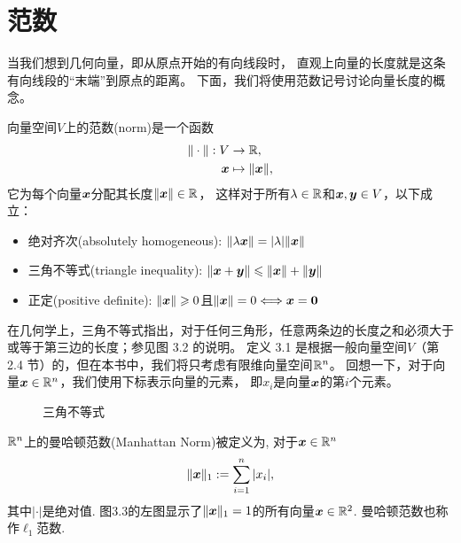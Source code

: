 \section{范数}
当我们想到几何向量，即从原点开始的有向线段时，
直观上向量的长度就是这条有向线段的“末端”到原点的距离。
下面，我们将使用范数记号讨论向量长度的概念。

\begin{definition}[范数]
    向量空间$V$上的范数(norm)是一个函数
    \begin{align}
        \| \cdot \| : V &\rightarrow \mathbb{R},\\
        \boldsymbol{x} &\mapsto \|\boldsymbol{x}\|,
    \end{align}
    它为每个向量$\boldsymbol{x}$分配其长度$\|\boldsymbol{x}\| \in \mathbb{R}$，
    这样对于所有$\lambda \in \mathbb{R}$和$\boldsymbol{x}, \boldsymbol{y} \in V$，以下成立：
    \begin{itemize}
        \item 绝对齐次(absolutely homogeneous): $\|\lambda\boldsymbol{x}\| = |\lambda|\|\boldsymbol{x}\|$
        \item 三角不等式(triangle inequality): $\|\boldsymbol{x}+\boldsymbol{y}\| \leqslant \|\boldsymbol{x}\| + \|\boldsymbol{y}\|$
        \item 正定(positive definite): $\|\boldsymbol{x}\| \geqslant 0$且$\|\boldsymbol{x}\| = 0 \Longleftrightarrow \boldsymbol{x} = \boldsymbol{0}$
    \end{itemize}
\end{definition}

在几何学上，三角不等式指出，对于任何三角形，任意两条边的长度之和必须大于或等于第三边的长度；参见图 3.2 的说明。
定义 3.1 是根据一般向量空间$V$（第 2.4 节）的，但在本书中，我们将只考虑有限维向量空间$\mathbb{R}^n$。
回想一下，对于向量$\boldsymbol{x} \in \mathbb{R}^n$，我们使用下标表示向量的元素，
即$x_i$是向量$\boldsymbol{x}$的第$i$个元素。

\begin{figure}[H]
    \caption{三角不等式}
\end{figure}

\begin{example}[曼哈顿范数]
    $\mathbb{R}^n$上的曼哈顿范数(Manhattan Norm)被定义为, 对于$\boldsymbol{x} \in \mathbb{R}^n$
    \begin{equation}
        \|\boldsymbol{x}\|_1 := \sum^n_{i=1}|x_i|,
    \end{equation}
    其中$|\cdot|$是绝对值.
    图3.3的左图显示了$\|\boldsymbol{x}\|_1 = 1$的所有向量$\boldsymbol{x} \in \mathbb{R}^2$.
    曼哈顿范数也称作$\ell_1$范数.
\end{example}

